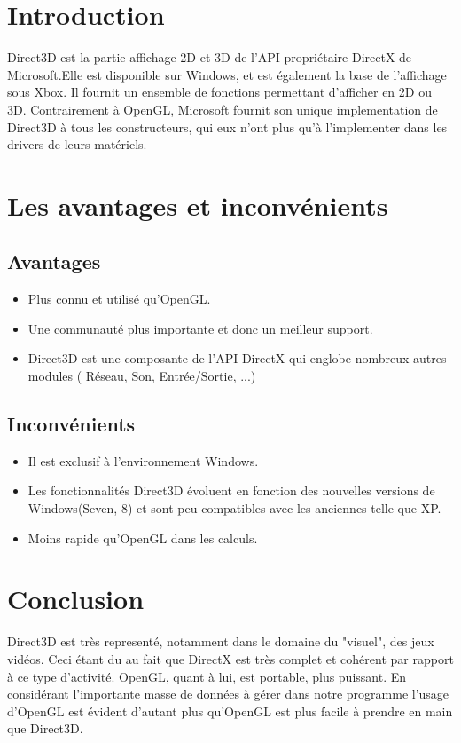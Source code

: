 \section{Introduction}
Direct3D est la partie affichage 2D et 3D de l'API propriétaire DirectX de Microsoft.Elle est disponible sur Windows, et est également la base de l'affichage sous Xbox. 
\newline
Il fournit un ensemble de fonctions permettant d'afficher en 2D ou 3D.
\newline
Contrairement à OpenGL, Microsoft fournit son unique implementation de Direct3D à tous les constructeurs, qui eux n'ont plus qu'à l'implementer dans les drivers de leurs matériels.
  
\section{Les avantages et inconvénients}
\subsection{Avantages}
\begin{itemize}
\item Plus connu et utilisé qu'OpenGL.
\item Une communauté plus importante et donc un meilleur support.
\item Direct3D est une composante de l'API DirectX qui englobe nombreux autres modules ( Réseau, Son, Entrée/Sortie, ...)
\end{itemize}

\subsection{Inconvénients}
\begin{itemize}
\item Il est exclusif à l'environnement Windows.
\item Les fonctionnalités Direct3D évoluent en fonction des nouvelles versions de Windows(Seven, 8) et sont peu compatibles avec les anciennes telle que XP. 
\item Moins rapide qu'OpenGL dans les calculs.
\end{itemize}

\section{Conclusion}
Direct3D est très representé, notamment dans le domaine du "visuel", des jeux vidéos. Ceci étant du au fait que DirectX est très complet et cohérent par rapport à ce type d'activité. OpenGL, quant à lui, est portable, plus puissant. En considérant l'importante masse de données à gérer dans notre programme l'usage d'OpenGL est évident d'autant plus qu'OpenGL est plus facile à prendre en main que Direct3D. 